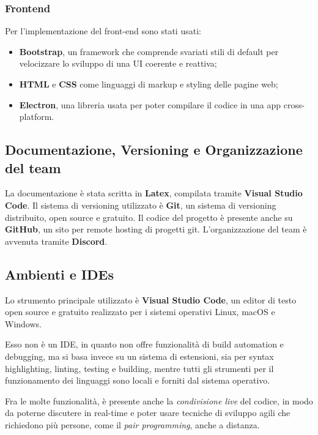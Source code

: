 \subsubsection{Frontend} Per l'implementazione del front-end sono stati usati:
\begin{itemize}
    \item \textbf{Bootstrap}, un framework che comprende svariati stili di default per
    velocizzare lo sviluppo di una UI coerente e reattiva;
    \item \textbf{HTML} e \textbf{CSS} come linguaggi di markup e styling delle pagine web;
    \item \textbf{Electron}, una libreria usata per poter compilare il codice 
     in una app cross-platform.
\end{itemize}

\vspace{5pt}
\subsection{Documentazione, Versioning e Organizzazione del team}
La documentazione è stata scritta in \textbf{Latex}, compilata tramite \textbf{Visual Studio Code}.
Il sistema di versioning utilizzato è \textbf{Git}, un sistema di versioning distribuito,
open source e gratuito. Il codice del progetto è presente anche su \textbf{GitHub}, un sito per remote hosting
di progetti git.
L'organizzazione del team è avvenuta tramite \textbf{Discord}.

\vspace{5pt}
\subsection{Ambienti e IDEs}
Lo strumento principale utilizzato è \textbf{Visual Studio Code}, un editor di
testo open source e gratuito realizzato per i sistemi operativi Linux, macOS
e Windows.

Esso non è un IDE, in quanto non offre funzionalità di build automation
e debugging, ma si basa invece su un sistema di estensioni, sia per syntax
highlighting, linting, testing e building, mentre tutti gli strumenti per il
funzionamento dei linguaggi sono locali e forniti dal sistema operativo.

Fra le molte funzionalità, è presente anche la \textit{condivisione live} del codice, in
modo da poterne discutere in real-time e poter usare tecniche di sviluppo
agili che richiedono più persone, come il \textit{pair programming}, anche a distanza.


